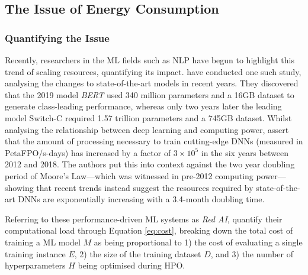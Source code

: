 \documentclass[a4paper, 12pt]{article}
\begin{document}
    \subsection{The Issue of Energy Consumption}

    \subsubsection{Quantifying the Issue}

    Recently, researchers in the ML fields such as NLP have begun to highlight this trend of scaling resources, quantifying its impact. \citet{bender-2021} have conducted one such study, analysing the changes to state-of-the-art models in recent years. They discovered that the 2019 model \emph{BERT} \citep{devlin-2019} used 340 million parameters and a 16GB dataset to generate class-leading performance, whereas only two years later the leading model Switch-C \citep{fedus-2021} required 1.57 trillion parameters and a 745GB dataset. Whilst analysing the relationship between deep learning and computing power, \citet{amodei-hernandez-2021} assert that the amount of processing necessary to train cutting-edge DNNs (measured in PetaFPO/s-days) has increased by a factor of $3 \times 10^5$ in the six years between 2012 and 2018. The authors put this into context against the two year doubling period of Moore's Law---which was witnessed in pre-2012 computing power---showing that recent trends instead suggest the resources required by state-of-the-art DNNs are exponentially increasing with a 3.4-month doubling time.

    Referring to these performance-driven ML systems as \emph{Red AI}, \citet{schwartz-2019} quantify their computational load through Equation \ref{eq:cost}, breaking down the total cost of training a ML model $M$ as being proportional to 1) the cost of evaluating a single training instance $E$, 2) the size of the training dataset $D$, and 3) the number of hyperparameters $H$ being optimised during HPO.
\end{document}
